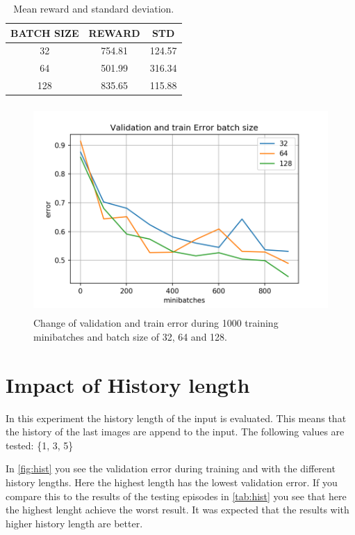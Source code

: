 \documentclass[a4paper,12pt]{article}
\begin{document}
\begin{table}[h] 
	\centering
	\begin{tabular}{|c |c | c|} 
		\hline
		\bfseries{BATCH SIZE} & \bfseries{REWARD} & \bfseries{STD} \\ 
		\hline\hline
		32 & 754.81 & 124.57\\ 
		
		64 & 501.99 & 316.34 \\
		
		128 & 835.65 & 115.88 \\ 
		\hline
	\end{tabular}
	\caption{\label{tab:batch} Mean reward and standard deviation.}
\end{table}

\begin{figure}[H]
	\centering \includegraphics[width=11.70cm, height=7.9cm]{plots/valid_error_batch.png}
	\caption{
		\label{fig:batch}
		Change of validation and train error during 1000 training minibatches and batch size of 32, 64 and 128.
	}
\end{figure}

\section{Impact of History length}\label{history}

In this experiment the history length of the input is evaluated. This means that the history of the last images are append to the input. The following values are tested: \{1, 3, 5\}

In \autoref{fig:hist} you see the validation error during training and with the different history lengths. Here the highest length has the lowest validation error. If you compare this to the results of the testing episodes in \autoref{tab:hist} you see that here the highest lenght achieve the worst result. It was expected that the results with higher history length are better.
\end{document}
